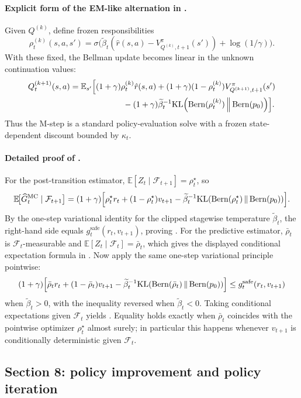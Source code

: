\documentclass{article}
\theoremstyle{remark}
\DeclareMathOperator{\Bern}{Bern}
\newcommand{\E}{\mathbb{E}}
\newcommand{\KL}{\mathrm{KL}}
\newcommand{\pprior}{p_0}
\newcommand{\KLbin}[2]{\KL\!\left(\Bern(#1)\,\middle\|\,\Bern(#2)\right)}
\newcommand{\safe}{\mathrm{safe}}
\begin{document}
\paragraph{Explicit form of the EM-like alternation in .}
Given $Q^{(k)}$, define frozen responsibilities
\[
\rho_t^{(k)}(s,a,s')=\sigma\!\bigl(\widetilde\beta_t(\hat r(s,a)-V_{Q^{(k)},t+1}^{\pi}(s'))+\log(1/\gamma)\bigr).
\]
With these fixed, the Bellman update becomes linear in the unknown continuation values:
\begin{align*}
Q_{t}^{(k+1)}(s,a)
&=\E_{s'}\Bigl[
    (1+\gamma)\rho_t^{(k)}\hat r(s,a)
    +(1+\gamma)(1-\rho_t^{(k)})V_{Q^{(k+1)},t+1}^{\pi}(s') \\
&\hspace{6.5em}
    -(1+\gamma)\widetilde\beta_t^{-1}\KLbin{\rho_t^{(k)}}{\pprior}
\Bigr].
\end{align*}
Thus the M-step is a standard policy-evaluation solve with a frozen state-dependent discount bounded by $\kappa_t$.

\paragraph{Detailed proof of .}
For the post-transition estimator, $\E[Z_t\mid \mathcal F_{t+1}]=\rho_t^\star$, so
\[
\E\!\bigl[\widehat G_t^{\mathrm{MC}}\mid \mathcal F_{t+1}\bigr]
=(1+\gamma)\Bigl[\rho_t^\star r_t +(1-\rho_t^\star)v_{t+1}-\widetilde\beta_t^{-1}\KLbin{\rho_t^\star}{\pprior}\Bigr].
\]
By the one-step variational identity for the clipped stagewise temperature $\widetilde\beta_t$, the right-hand side equals $g_t^{\safe}(r_t,v_{t+1})$, proving .
For the predictive estimator, $\bar\rho_t$ is $\mathcal F_t$-measurable and $\E[Z_t\mid \mathcal F_t]=\bar\rho_t$, which gives the displayed conditional expectation formula in .
Now apply the same one-step variational principle pointwise:
\[
(1+\gamma)\Bigl[\bar\rho_t r_t +(1-\bar\rho_t)v_{t+1}-\widetilde\beta_t^{-1}\KLbin{\bar\rho_t}{\pprior}\Bigr]
\le g_t^{\safe}(r_t,v_{t+1})
\]
when $\widetilde\beta_t>0$, with the inequality reversed when $\widetilde\beta_t<0$.
Taking conditional expectations given $\mathcal F_t$ yields .
Equality holds exactly when $\bar\rho_t$ coincides with the pointwise optimizer $\rho_t^\star$ almost surely; in particular this happens whenever $v_{t+1}$ is conditionally deterministic given $\mathcal F_t$.

\subsection{Section 8: policy improvement and policy iteration}
\label{app:policy-iter}
\end{document}

